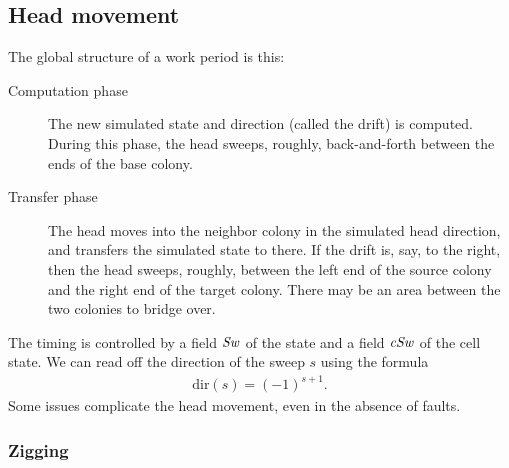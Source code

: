 \documentclass[12pt]{memoir}
\newcommand{\fld}[1]{\ensuremath{\textit{#1\/}}}
\newcommand{\Sweep}{\fld{Sw}}
\newcommand{\cSweep}{\fld{cSw}}
\newcommand{\dir}{\mathrm{dir}}
\begin{document}
\subsection{Head movement}\label{sec:sweep}

The global structure of a work period is this:
\begin{description}

\item[Computation phase] 
The new simulated state and direction (called the drift) is computed.
During this phase, the head sweeps, roughly, back-and-forth between
the ends of the base colony.

\item[Transfer phase]
The head moves into the neighbor colony in the simulated head direction,
and transfers the simulated state to there.
If the drift is, say, to the right, then the head sweeps, roughly, between the 
left end of the source colony and the right end of the target colony.
There may be an area between the  two colonies to bridge over.
\end{description}

The timing is controlled by a field \( \Sweep \) of the state and a field \( \cSweep \)  of the
cell state.
We can read off the direction of the sweep \( s \) using the formula
     \begin{align}\label{eq:sweep-dir}
       \dir(s)=(-1)^{s + 1}.
     \end{align}
Some issues complicate the head movement, even in the absence of faults.

\subsubsection{Zigging}\label{sec:zigging}
\end{document}
